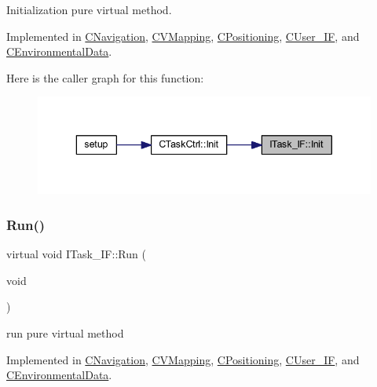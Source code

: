 Initialization pure virtual method. 



Implemented in \mbox{\hyperlink{class_c_navigation_a86a0756663ccf76e9c474764b8f7a04f}{C\+Navigation}}, \mbox{\hyperlink{class_c_v_mapping_a110257122b8946bcb8f17051070e03eb}{C\+V\+Mapping}}, \mbox{\hyperlink{class_c_positioning_abdceba66e701554a178acf61c61b0df6}{C\+Positioning}}, \mbox{\hyperlink{class_c_user___i_f_a02c8bba754c77583dc5afaa6877dc547}{C\+User\+\_\+\+IF}}, and \mbox{\hyperlink{class_c_environmental_data_a3321cce122ef1e1f7e995ee51353e87d}{C\+Environmental\+Data}}.

Here is the caller graph for this function\+:\nopagebreak
\begin{figure}[H]
\begin{center}
\leavevmode
\includegraphics[width=343pt]{class_i_task___i_f_a28f608bdb9b19658403f7b9b7421968d_icgraph}
\end{center}
\end{figure}
\mbox{\label{class_i_task___i_f_ab73cc5879a61d00fc59b72cce32cc6f7}} 
\subsubsection{\texorpdfstring{Run()}{Run()}}
{\footnotesize\ttfamily virtual void I\+Task\+\_\+\+I\+F\+::\+Run (\begin{DoxyParamCaption}\item[{void}]{ }\end{DoxyParamCaption})\hspace{0.3cm}{\ttfamily [pure virtual]}}



run pure virtual method 



Implemented in \mbox{\hyperlink{class_c_navigation_a86acb1521aab400e542465c8eabed671}{C\+Navigation}}, \mbox{\hyperlink{class_c_v_mapping_a8f064fcfd01953d7072efd5de23f89ef}{C\+V\+Mapping}}, \mbox{\hyperlink{class_c_positioning_ad0e439dcc95c450548c2806077aeff57}{C\+Positioning}}, \mbox{\hyperlink{class_c_user___i_f_a1be2e11cd5df5ad0fa5a74a0eb283ec5}{C\+User\+\_\+\+IF}}, and \mbox{\hyperlink{class_c_environmental_data_a586a729d3aab2873812517d950c91242}{C\+Environmental\+Data}}.

